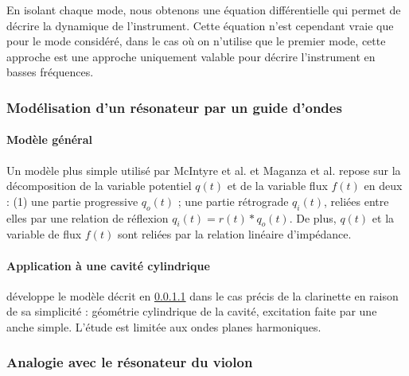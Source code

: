 \documentclass[atiam, article]{rapport} %
\begin{document}
En isolant chaque mode, nous obtenons une équation différentielle qui permet de décrire la dynamique de l'instrument. Cette équation n'est cependant vraie que pour le mode considéré, dans le cas où on n'utilise que le premier mode, cette approche est une approche uniquement valable pour décrire l'instrument en basses fréquences. 

\subsubsection{Modélisation d'un résonateur par un guide d'ondes}

\paragraph{Modèle général}\label{sec:guide}

Un modèle plus simple utilisé par McIntyre et al. \cite{mcintyre_oscillations_1983} et Maganza et al. \cite{maganza_bifurcations_1986} repose sur la décomposition de la variable potentiel $q(t)$ et de la variable flux $f(t)$ en deux : (1) une partie progressive $q_o(t)$ ; une partie rétrograde $q_i(t)$, reliées entre elles par une relation de réflexion $q_i(t)=r(t)*q_o(t)$. De plus, $q(t)$ et la variable de flux $f(t)$ sont reliées par la relation linéaire d'impédance.

 
\paragraph{Application à une cavité cylindrique}

\cite{maganza_bifurcations_1986} développe le modèle décrit en \ref{sec:guide} dans le cas précis de la clarinette en raison de sa simplicité : géométrie cylindrique de la cavité, excitation faite par une anche simple. L'étude est limitée aux ondes planes harmoniques.%


\subsubsection{Analogie avec le résonateur du violon}
\end{document}
